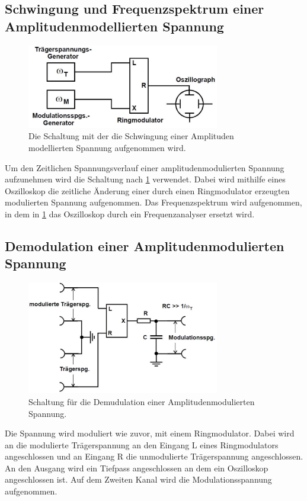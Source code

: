 \subsection{Schwingung und Frequenzspektrum einer Amplitudenmodellierten Spannung}
\begin{figure}[h!]
	\centering
	\includegraphics[width = 0.75\textwidth]{../Grafiken/Versuchsaufbau_a.pdf}
	\caption{Die Schaltung mit der die Schwingung einer Amplituden modellierten Spannung aufgenommen wird.\cite{V59}\label{fig:Aufbau_a}}
\end{figure}
Um den Zeitlichen Spannungsverlauf einer amplitudenmodulierten Spannung aufzunehmen wird die Schaltung nach \cref{fig:Aufbau_a} verwendet.
Dabei wird mithilfe eines Oszilloskop die zeitliche Änderung einer durch einen Ringmodulator erzeugten modulierten Spannung aufgenommen.
Das Frequenzspektrum wird aufgenommen, in dem in \cref{fig:Aufbau_a} das Oszilloskop durch ein Frequenzanalyser ersetzt wird.
\newpage
\subsection{Demodulation einer Amplitudenmodulierten Spannung}
\begin{figure}[h!]
	\centering
	\includegraphics[width = 0.75\textwidth]{../Grafiken/Versuchsaufbau_DemAmplitude_Ringmodulator.pdf}
	\caption{Schaltung für die Demudulation einer Amplitudenmodulierten Spannung.\cite{V59}}
\end{figure}
Die Spannung wird moduliert wie zuvor, mit einem Ringmodulator. 
Dabei wird an die modulierte Trägerspannung an den Eingang L eines Ringmodulators angeschlossen und an Eingang R die unmodulierte Trägerspannung angeschlossen.
An den Ausgang wird ein Tiefpass angeschlossen an dem ein Oszilloskop angeschlossen ist.
Auf dem Zweiten Kanal wird die Modulationsspannung aufgenommen.

